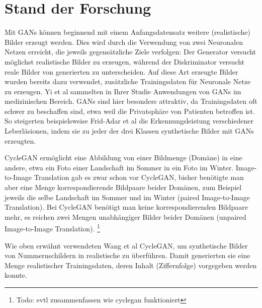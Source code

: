 \chapter*{Stand der Forschung}
Mit GANs\cite{gan} können beginnend mit einem Anfangsdatensatz weitere (realistische) Bilder erzeugt werden.
Dies wird durch die Verwendung von zwei Neuronalen Netzen erreicht, die jeweils gegensätzliche Ziele verfolgen:
Der Generator versucht möglichst realistische Bilder zu erzeugen, während der Diskriminator versucht reale Bilder von generierten zu unterscheiden.
Auf diese Art erzeugte Bilder wurden bereits dazu verwendet, zusätzliche Trainingsdaten für Neuronale Netze zu erzeugen.
Yi et al\cite{medic} sammelten in Ihrer Studie Anwendungen von GANs im medizinischen Bereich. GANs sind hier besonders attraktiv, da Trainingsdaten oft
schwer zu beschaffen sind, etwa weil die Privatsphäre von Patienten betroffen ist.
So steigerten beispielsweise Frid-Adar et al\cite{liver} die Erkennungsleistung verschiedener Leberläsionen,
indem sie zu jeder der drei Klassen synthetische Bilder mit GANs erzeugten.

CycleGAN\cite{cyclegan} ermöglicht eine Abbildung von einer Bildmenge (Domäne) in eine andere, etwa ein Foto einer Landschaft im Sommer in ein Foto im Winter.
Image-to-Image Translation gab es zwar schon vor CycleGAN, bisher benötigte man aber eine Menge korrespondierende Bildpaare beider Domänen, zum Beispiel jeweils die selbe Landschaft im Sommer und im Winter (paired Image-to-Image Translation).
Bei CycleGAN benötigt man keine korrespondierenden Bildpaare mehr, es reichen zwei Mengen unabhängiger Bilder beider Domänen (unpaired Image-to-Image Translation).
\footnote{Todo: evtl zusammenfassen wie cyclegan funktioniert}

Wie oben erwähnt verwendeten Wang et al\cite{lplate} CycleGAN, um synthetische Bilder von Nummernschildern in realistische zu überführen. Damit generierten sie 
eine Menge realistischer Trainingsdaten, deren Inhalt (Ziffernfolge) vorgegeben werden konnte.
